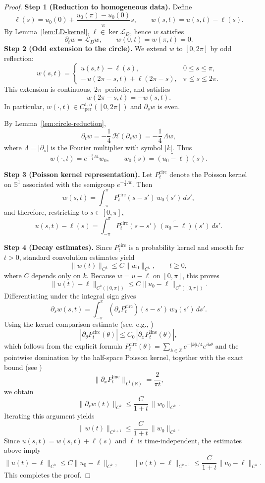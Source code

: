 \documentclass{amsart}
\begin{document}
\begin{proof}
\textbf{Step 1 (Reduction to homogeneous data).}
Define
\[
\ell(s)=u_0(0)+\frac{u_0(\pi)-u_0(0)}{\pi}s,
\qquad
w(s,t)=u(s,t)-\ell(s).
\]
By Lemma~\ref{lem:LD-kernel}, $\ell\in\ker\mathcal{L}_D$, hence $w$ satisfies
\[
\partial_t w=\mathcal{L}_D w,
\qquad
w(0,t)=w(\pi,t)=0.
\]
\textbf{Step 2 (Odd extension to the circle).}
We extend $w$ to $[0,2\pi]$ by odd reflection:
\[
w(s,t)=
\begin{cases}
u(s,t)-\ell(s), & 0\le s\le\pi,\\
-\,u(2\pi-s,t)+\ell(2\pi-s), & \pi\le s\le2\pi.
\end{cases}
\]
This extension is continuous, $2\pi$--periodic, and satisfies
\[
w(2\pi-s,t)=-w(s,t).
\]
In particular, $w(\cdot,t)\in C^{1,\alpha}_{\mathrm{per}}([0,2\pi])$ and
$\partial_s w$ is even.

By Lemma~\ref{lem:circle-reduction},
\[
\partial_t w
=
-\frac14\,\mathcal{H}(\partial_s w)
=
-\frac14\,\Lambda w,
\]
where $\Lambda=|\partial_s|$ is the Fourier multiplier with symbol $|k|$.
Thus
\[
w(\cdot,t)=e^{-\frac14\Lambda t}w_0,
\qquad
w_0(s)=\widetilde{(u_0-\ell)}(s).
\]

\textbf{Step 3 (Poisson kernel representation).}
Let $P^{\mathrm{circ}}_t$ denote the Poisson kernel on $\mathbb S^1$
associated with the semigroup $e^{-\frac14\Lambda t}$.
Then
\[
w(s,t)
=
\int_{-\pi}^{\pi}
P^{\mathrm{circ}}_t(s-s')\,w_0(s')\,ds',
\]
and therefore, restricting to $s\in[0,\pi]$,
\[
u(s,t)-\ell(s)
=
\int_{-\pi}^{\pi}
P^{\mathrm{circ}}_t(s-s')\,
\widetilde{(u_0-\ell)}(s')\,ds'.
\]

\textbf{Step 4 (Decay estimates).}
Since $P^{\mathrm{circ}}_t$ is a probability kernel and smooth for $t>0$,
standard convolution estimates yield
\[
\|w(t)\|_{C^k}
\le C\|w_0\|_{C^k},
\qquad t\ge0,
\]
where $C$ depends only on $k$.
Because $w=u-\ell$ on $[0,\pi]$, this proves
\[
\|u(t)-\ell\|_{C^k([0,\pi])}
\le C\|u_0-\ell\|_{C^k([0,\pi])}.
\]
Differentiating under the integral sign gives
\[
\partial_s w(s,t)
=
\int_{-\pi}^{\pi}
(\partial_s P^{\mathrm{circ}}_t)(s-s')\,w_0(s')\,ds'.
\]
Using the kernel comparison estimate (see, e.g., \cite{stein1970singular})
\[
|\partial_\theta P^{\mathrm{circ}}_t(\theta)|
\le C_0\,|\partial_x P^{\mathrm{line}}_t(\theta)|,
\]
which follows from the explicit formula $P^{\mathrm{circ}}_t(\theta) = \sum_{k\in\mathbb{Z}} e^{-|k|t/4}e^{ik\theta}$ and the pointwise domination by the half-space Poisson kernel,
together with the exact bound (see \cite{stein1970singular})
\[
\|\partial_x P^{\mathrm{line}}_t\|_{L^1(\mathbb R)}
=
\frac{2}{\pi t},
\]
we obtain
\[
\|\partial_s w(t)\|_{C^k}
\le
\frac{C}{1+t}\,\|w_0\|_{C^k}.
\]
Iterating this argument yields
\[
\|w(t)\|_{C^{k+1}}
\le
\frac{C}{1+t}\,\|w_0\|_{C^k}.
\]
Since $u(s,t)=w(s,t)+\ell(s)$ and $\ell$ is time-independent,
the estimates above imply
\[
\|u(t)-\ell\|_{C^k}
\le C\|u_0-\ell\|_{C^k},
\qquad
\|u(t)-\ell\|_{C^{k+1}}
\le \frac{C}{1+t}\|u_0-\ell\|_{C^k}.
\]
This completes the proof.
\end{proof}
\end{document}
